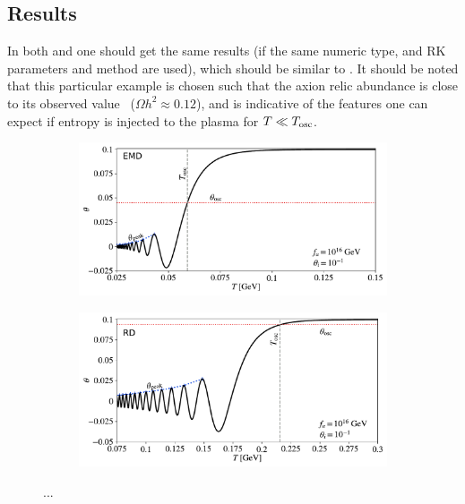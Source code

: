 \documentclass[11pt,a4paper]{article}
\begin{document}
\subsection{Results}
%
In both \CPP and \PY one should get the same results (if the same numeric type, and RK parameters and method are used), which should be similar to . 
%
It should be noted that this particular example is chosen such that the axion relic abundance is close to its observed value~\cite{Planck:2018vyg} ($\Omega h^2 \approx 0.12$), and is indicative of the features one can expect if entropy is injected to the plasma for $T \ll T_{\rm osc}{}$.
%
\begin{figure}[h]
	\begin{subfigure}[]{0.5\textwidth}
		\includegraphics[width=1\textwidth]{figs/theta_evolution-EMD.pdf}
		\caption{}
		\label{fig:theta_evolution-EMD}
	\end{subfigure}
	\begin{subfigure}[]{0.5\textwidth}
		\includegraphics[width=1\textwidth]{figs/theta_evolution-RD.pdf}
		\caption{}
		\label{fig:theta_evolution-RD}
	\end{subfigure}
	\caption{...}
	\label{fig:results}
\end{figure}
%
\end{document}
